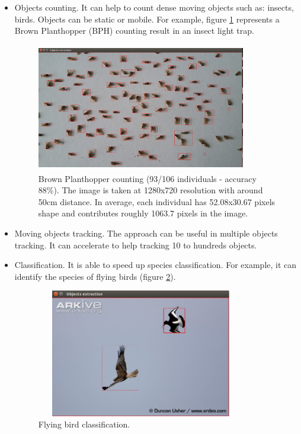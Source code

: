 \documentclass[10pt,a4paper]{article}
\begin{document}
\begin{itemize}
\item Objects counting. It can help to count dense moving objects such as: insects, birds. Objects can be static or mobile. For example, figure  \ref{img:BPHCount} represents a Brown Planthopper (BPH) counting result in an insect light trap.

\begin{figure}[ht]
\centering
\includegraphics[width=3.6in,height=2.2in]{img/BPHCount.png}
\caption{Brown Planthopper counting (93/106 individuals - accuracy 88\%). The image is taken at 1280x720 resolution with around 50cm distance. In average, each individual has 52.08x30.67 pixels shape and contributes roughly 1063.7 pixels in the image.}
\label{img:BPHCount}
\end{figure}

\item  Moving objects tracking. The approach can be useful in multiple objects tracking. It can accelerate to help tracking 10 to hundreds objects.

\item  Classification. It is able to speed up species classification. For example, it can identify the species of flying birds (figure \ref{img:Birds}).

\begin{figure}[ht]
\centering
\includegraphics[width=3.6in,height=2.2in]{img/Bird.png}
\caption{Flying bird classification.}
\label{img:Birds}
\end{figure}

\end{itemize}
\end{document}
